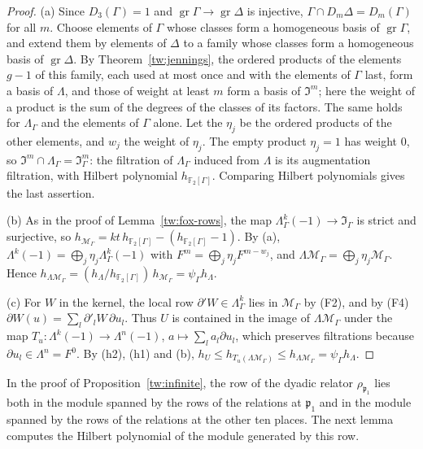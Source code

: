 \documentclass[11pt]{amsart}
\numberwithin{equation}{section}
\theoremstyle{definition}
\theoremstyle{remark}
\newcommand{\Ftwo}{\mathbb F_2}
\begin{document}
\begin{proof}
(a) Since $D_3(\Gamma)=1$ and $\operatorname{gr}\Gamma\to\operatorname{gr}\Delta$
is injective, $\Gamma\cap D_m\Delta=D_m(\Gamma)$ for all $m$. Choose elements
of $\Gamma$ whose classes form a homogeneous basis of $\operatorname{gr}\Gamma$,
and extend them by elements of $\Delta$ to a family whose classes form a
homogeneous basis of $\operatorname{gr}\Delta$. By Theorem~\ref{tw:jennings},
the ordered products of the elements $g-1$ of this family, each used at most
once and with the elements of $\Gamma$ last, form a basis of $\Lambda$, and
those of weight at least $m$ form a basis of $\mathfrak I^m$; here the weight
of a product is the sum of the degrees of the classes of its factors. The
same holds for $\Lambda_\Gamma$ and the elements of $\Gamma$ alone. Let the
$\eta_j$ be the ordered products of the other elements, and $w_j$ the weight
of $\eta_j$. The empty product $\eta_j=1$ has weight $0$, so
$\mathfrak I^m\cap\Lambda_\Gamma=\mathfrak I_\Gamma^m$: the filtration of
$\Lambda_\Gamma$ induced from $\Lambda$ is its augmentation filtration, with
Hilbert polynomial $h_{\Ftwo[\Gamma]}$. Comparing Hilbert polynomials gives the
last assertion.

(b) As in the proof of Lemma~\ref{tw:fox-rows}, the map
$\Lambda_\Gamma^k(-1)\to\mathfrak I_\Gamma$ is strict and surjective, so
$h_{\mathcal M_\Gamma}=kt\,h_{\Ftwo[\Gamma]}-(h_{\Ftwo[\Gamma]}-1)$. By (a),
$\Lambda^k(-1)=\bigoplus_j\eta_j\Lambda_\Gamma^k(-1)$ with
$F^m=\bigoplus_j\eta_jF^{m-w_j}$, and
$\Lambda\mathcal M_\Gamma=\bigoplus_j\eta_j\mathcal M_\Gamma$. Hence
$h_{\Lambda\mathcal M_\Gamma}=(h_\Lambda/h_{\Ftwo[\Gamma]})\,h_{\mathcal M_\Gamma}=\psi_\Gamma h_\Lambda$.

(c) For $W$ in the kernel, the local row $\partial'W\in\Lambda_\Gamma^k$ lies in
$\mathcal M_\Gamma$ by (F2), and by (F4)
$\partial W(u)=\sum_l\partial'_lW\,\partial u_l$. Thus $U$ is contained in the
image of $\Lambda\mathcal M_\Gamma$ under the map
$T_u\colon\Lambda^k(-1)\to\Lambda^n(-1)$, $a\mapsto\sum_la_l\partial u_l$,
which preserves filtrations because $\partial u_l\in\Lambda^n=F^0$. By (h2),
(h1) and (b),
$h_U\le h_{T_u(\Lambda\mathcal M_\Gamma)}\le h_{\Lambda\mathcal M_\Gamma}=\psi_\Gamma h_\Lambda$.
\end{proof}

In the proof of Proposition~\ref{tw:infinite}, the row of the dyadic relator
$\rho_{\mathfrak p_1}$ lies both in the module spanned by the rows of the
relations at $\mathfrak p_1$ and in the module spanned by the rows of the
relations at the other ten places. The next lemma computes the Hilbert
polynomial of the module generated by this row.
\end{document}
